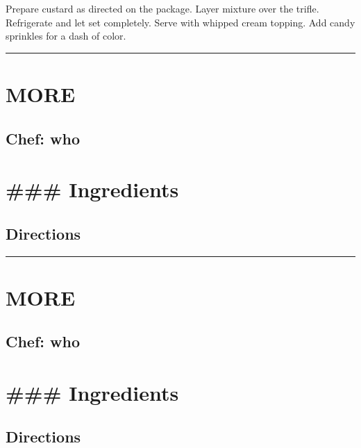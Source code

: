 \documentclass[
]{book}
\begin{document}
Prepare custard as directed on the package. Layer mixture over the trifle. Refrigerate and let set completely. Serve with whipped cream topping. Add candy sprinkles for a dash of color.

\begin{center}\rule{0.5\linewidth}{0.5pt}\end{center}

\hypertarget{more-4}{%
\section*{MORE}\label{more-4}}


\hypertarget{chef-who-4}{%
\subsection*{Chef: who}\label{chef-who-4}}


\hypertarget{ingredients-91}{%
\section*{\#\#\# Ingredients}\label{ingredients-91}}


\hypertarget{directions-91}{%
\subsection*{Directions}\label{directions-91}}


\begin{center}\rule{0.5\linewidth}{0.5pt}\end{center}

\hypertarget{more-5}{%
\section*{MORE}\label{more-5}}


\hypertarget{chef-who-5}{%
\subsection*{Chef: who}\label{chef-who-5}}


\hypertarget{ingredients-92}{%
\section*{\#\#\# Ingredients}\label{ingredients-92}}


\hypertarget{directions-92}{%
\subsection*{Directions}\label{directions-92}}
\end{document}
